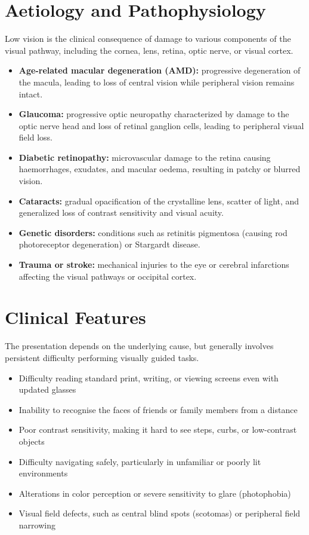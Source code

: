\section*{Aetiology and Pathophysiology}
Low vision is the clinical consequence of damage to various components of the visual pathway, including the cornea, lens, retina, optic nerve, or visual cortex.
\begin{itemize}
    \item \textbf{Age-related macular degeneration (AMD):} progressive degeneration of the macula, leading to loss of central vision while peripheral vision remains intact.
    \item \textbf{Glaucoma:} progressive optic neuropathy characterized by damage to the optic nerve head and loss of retinal ganglion cells, leading to peripheral visual field loss.
    \item \textbf{Diabetic retinopathy:} microvascular damage to the retina causing haemorrhages, exudates, and macular oedema, resulting in patchy or blurred vision.
    \item \textbf{Cataracts:} gradual opacification of the crystalline lens, scatter of light, and generalized loss of contrast sensitivity and visual acuity.
    \item \textbf{Genetic disorders:} conditions such as retinitis pigmentosa (causing rod photoreceptor degeneration) or Stargardt disease.
    \item \textbf{Trauma or stroke:} mechanical injuries to the eye or cerebral infarctions affecting the visual pathways or occipital cortex.
\end{itemize}

\section*{Clinical Features}
The presentation depends on the underlying cause, but generally involves persistent difficulty performing visually guided tasks.
\begin{itemize}
    \item Difficulty reading standard print, writing, or viewing screens even with updated glasses
    \item Inability to recognise the faces of friends or family members from a distance
    \item Poor contrast sensitivity, making it hard to see steps, curbs, or low-contrast objects
    \item Difficulty navigating safely, particularly in unfamiliar or poorly lit environments
    \item Alterations in color perception or severe sensitivity to glare (photophobia)
    \item Visual field defects, such as central blind spots (scotomas) or peripheral field narrowing
\end{itemize}

